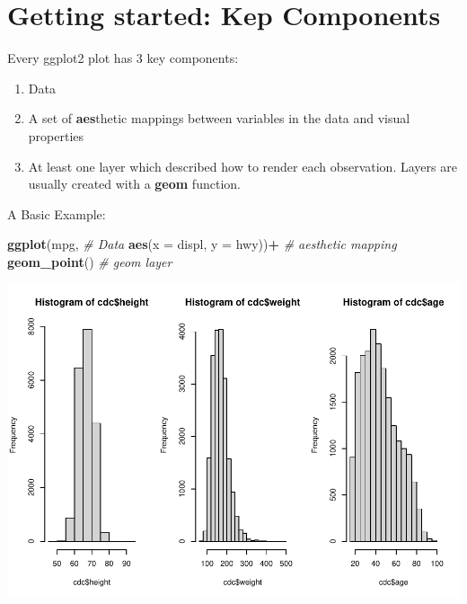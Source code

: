 \documentclass[
]{book}
\newenvironment{Shaded}{\begin{snugshade}}{\end{snugshade}}
\newcommand{\CommentTok}[1]{\textcolor[rgb]{0.56,0.35,0.01}{\textit{#1}}}
\newcommand{\DataTypeTok}[1]{\textcolor[rgb]{0.13,0.29,0.53}{#1}}
\newcommand{\KeywordTok}[1]{\textcolor[rgb]{0.13,0.29,0.53}{\textbf{#1}}}
\newcommand{\NormalTok}[1]{#1}
\newcommand{\OperatorTok}[1]{\textcolor[rgb]{0.81,0.36,0.00}{\textbf{#1}}}
\newcommand{\StringTok}[1]{\textcolor[rgb]{0.31,0.60,0.02}{#1}}
\begin{document}
\hypertarget{getting-started-kep-components}{%
\section{Getting started: Kep Components}\label{getting-started-kep-components}}

Every ggplot2 plot has 3 key components:

\begin{enumerate}
\def\labelenumi{\arabic{enumi})}
\item
  Data
\item
  A set of \textbf{aes}thetic mappings between variables in the data and visual properties
\item
  At least one layer which described how to render each observation. Layers are usually created with a \textbf{geom} function.
\end{enumerate}

A Basic Example:

\begin{Shaded}
\begin{Highlighting}[]
\KeywordTok{ggplot}\NormalTok{(mpg,                        }\CommentTok{# Data}
       \KeywordTok{aes}\NormalTok{(}\DataTypeTok{x =}\NormalTok{ displ, }\DataTypeTok{y =}\NormalTok{ hwy))}\OperatorTok{+}\StringTok{   }\CommentTok{# aesthetic mapping}
\StringTok{  }\KeywordTok{geom_point}\NormalTok{()                     }\CommentTok{# geom layer }
\end{Highlighting}
\end{Shaded}

\includegraphics{_main_files/figure-latex/unnamed-chunk-251-1.pdf}
\end{document}
